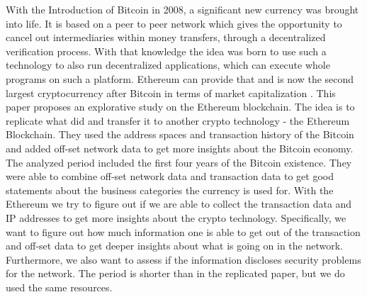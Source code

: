 With the Introduction of Bitcoin in 2008, a significant new currency was brought into life.
It is based on a peer to peer network which gives the opportunity to cancel out intermediaries within money transfers, through a decentralized verification process. 
With that knowledge the idea was born to use such a technology to also run decentralized applications, which can execute whole programs on such a platform. 
Ethereum can provide that and is now the second largest cryptocurrency after Bitcoin in terms of market capitalization \cite{BitInfoEther, BitInfoBitcoin}.
This paper proposes an explorative study on the Ethereum blockchain. 
The idea is to replicate what \cite{lischke2016analyzing} did and transfer it to another crypto technology - the Ethereum Blockchain. 
They used the address spaces and transaction history of the Bitcoin and added off-set network data to get more insights about the Bitcoin economy. 
The analyzed period included the first four years of the Bitcoin existence. They were able to combine off-set network data and transaction data to get good statements about the business categories the currency is used for. 
With the Ethereum we try to figure out if we are able to collect the transaction data and IP addresses to get more insights about the crypto technology. Specifically, we want to figure out how much information one is able to get out of the transaction and off-set data to get deeper insights about what is going on in the network. Furthermore, we also want to assess if the information discloses security problems for the network. 
The period is shorter than in the replicated paper, but we do used the same resources.

